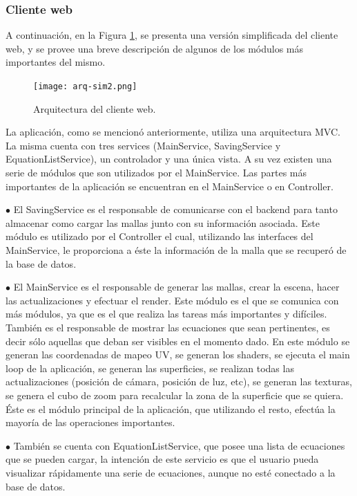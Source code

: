 \documentclass[12pt]{article}
\begin{document}
\subsubsection{Cliente web}
A continuación, en la Figura \ref{arq}, se presenta una versión simplificada del cliente web, y se provee una breve descripción de algunos de los módulos más importantes del mismo.\\
\begin{figure}[h!]
\texttt{[image: arq-sim2.png]}
\caption{Arquitectura del cliente web.}
\label{arq}
\end{figure}
La aplicación, como se mencionó anteriormente, utiliza una arquitectura MVC. La misma  cuenta con tres services (MainService, SavingService y EquationListService), un controlador y una única vista. A su vez existen una serie de módulos que son utilizados por el MainService. Las partes más importantes de la aplicación se encuentran en el MainService o en Controller.

$\bullet$ El SavingService es el responsable de comunicarse con el backend para tanto almacenar como cargar las mallas junto con su información asociada. Este módulo es utilizado por el Controller el cual, utilizando las interfaces del MainService, le proporciona a éste la información de la malla que se recuperó de la base de datos.

$\bullet$ El MainService es el responsable de generar las mallas, crear la escena, hacer las actualizaciones y efectuar el render. Este módulo es el que se comunica con más módulos, ya que es el que realiza las tareas más importantes y difíciles. También es el responsable de mostrar las ecuaciones que sean pertinentes, es decir sólo aquellas que deban ser visibles en el momento dado. En este módulo se generan las coordenadas de mapeo UV, se generan los shaders, se ejecuta el main loop de la aplicación, se generan las superficies, se realizan todas las actualizaciones (posición de cámara, posición de luz, etc), se generan las texturas, se genera el cubo de zoom para recalcular la zona de la superficie que se quiera. Éste es el módulo principal de la aplicación, que utilizando el resto, efectúa la mayoría de las operaciones importantes.

$\bullet$ También se cuenta con EquationListService, que posee una lista de ecuaciones que se pueden cargar, la intención de este servicio es que el usuario pueda visualizar rápidamente una serie de ecuaciones, aunque no esté conectado a la base de datos.
\end{document}
